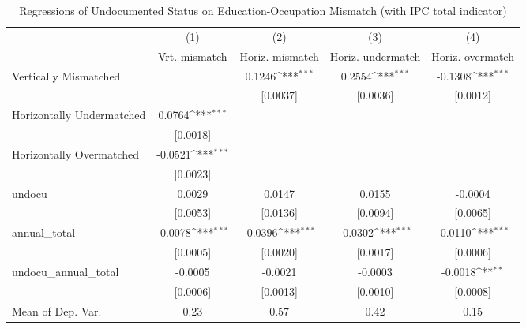 \begin{table}[htbp]\centering
\def\sym#1{\ifmmode^{#1}\else\(^{#1}\)\fi}
\caption{Regressions of Undocumented Status on Education-Occupation Mismatch (with IPC total indicator)}
\begin{tabular}{l*{4}{c}}
\toprule
                    &\multicolumn{1}{c}{(1)}         &\multicolumn{1}{c}{(2)}         &\multicolumn{1}{c}{(3)}         &\multicolumn{1}{c}{(4)}         \\
                    &Vrt. mismatch         &Horiz. mismatch         &Horiz. undermatch         &Horiz. overmatch         \\
\midrule
Vertically Mismatched&                     &      0.1246\sym{***}&      0.2554\sym{***}&     -0.1308\sym{***}\\
                    &                     &    [0.0037]         &    [0.0036]         &    [0.0012]         \\
\addlinespace
Horizontally Undermatched&      0.0764\sym{***}&                     &                     &                     \\
                    &    [0.0018]         &                     &                     &                     \\
\addlinespace
Horizontally Overmatched&     -0.0521\sym{***}&                     &                     &                     \\
                    &    [0.0023]         &                     &                     &                     \\
\addlinespace
undocu              &      0.0029         &      0.0147         &      0.0155         &     -0.0004         \\
                    &    [0.0053]         &    [0.0136]         &    [0.0094]         &    [0.0065]         \\
\addlinespace
annual\_total        &     -0.0078\sym{***}&     -0.0396\sym{***}&     -0.0302\sym{***}&     -0.0110\sym{***}\\
                    &    [0.0005]         &    [0.0020]         &    [0.0017]         &    [0.0006]         \\
\addlinespace
undocu\_annual\_total &     -0.0005         &     -0.0021         &     -0.0003         &     -0.0018\sym{**} \\
                    &    [0.0006]         &    [0.0013]         &    [0.0010]         &    [0.0008]         \\
\midrule
Mean of Dep. Var.   &        0.23         &        0.57         &        0.42         &        0.15         \\

\end{tabular}
\end{table}
